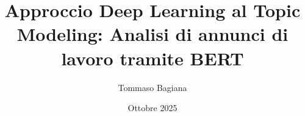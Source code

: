 \documentclass[12pt]{report}
\title{Approccio Deep Learning al Topic Modeling: Analisi di annunci di lavoro tramite BERT}
\author{Tommaso Bagiana}
\date{Ottobre 2025}
\begin{document}
\onehalfspacing


\newpage


\newpage

\tableofcontents
\newpage









\nocite{*}




\end{document}
